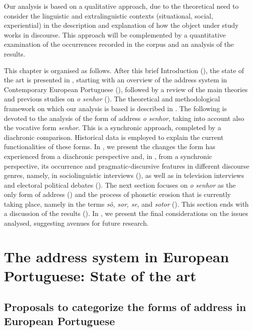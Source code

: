 \documentclass[output=paper]{langscibook}
\begin{document}
Our analysis is based on a qualitative approach, due to the theoretical need to consider the linguistic and extralinguistic contexts (situational, social, experiential) in the description and explanation of how the object under study works in discourse. This approach will be complemented by a quantitative examination of the occurrences recorded in the corpus and an analysis of the results.



This chapter is organised as follows. After this brief Introduction (), the state of the art is presented in , starting with an overview of the address system in Contemporary European Portuguese (), followed by a review of the main theories and previous studies on \textit{o senhor} (). The theoretical and methodological framework on which our analysis is based is described in . The following  is devoted to the analysis of the form of address \textit{o senhor}, taking into account also the vocative form \textit{senhor}. This is a synchronic approach, completed by a diachronic comparison. Historical data is employed to explain the current functionalities of these forms. In , we present the changes the form has experienced from a diachronic perspective and, in , from a synchronic perspective, its occurrence and pragmatic-discursive features in different discourse genres, namely, in sociolinguistic interviews (), as well as in television interviews and electoral political debates (). The next section focuses on \textit{o senhor} as the only form of address () and the process of phonetic erosion that is currently taking place, namely in the terms \textit{sô, sor, se,} and \textit{sotor} (). This section ends with a discussion of the results ().  In , we present the final considerations on the issues analysed, suggesting avenues for future research.


\section{The address system in European Portuguese: State of the art}\label{sec:marques:2}
\subsection{Proposals to categorize the forms of address in European Portuguese}\label{sec:marques:2.1}
\end{document}
